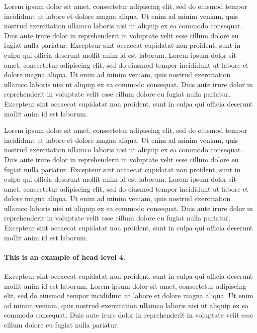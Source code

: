 \documentclass[english]{sbcreviews-2025}%
\begin{document}
Lorem ipsum dolor sit amet, consectetur adipiscing elit, sed do eiusmod tempor incididunt ut labore et dolore magna aliqua. Ut enim ad minim veniam, quis nostrud exercitation ullamco laboris nisi ut aliquip ex ea commodo consequat. Duis aute irure dolor in reprehenderit in voluptate velit esse cillum dolore eu fugiat nulla pariatur. Excepteur sint occaecat cupidatat non proident, sunt in culpa qui officia deserunt mollit anim id est laborum. Lorem ipsum dolor sit amet, consectetur adipiscing elit, sed do eiusmod tempor incididunt ut labore et dolore magna aliqua. Ut enim ad minim veniam, quis nostrud exercitation ullamco laboris nisi ut aliquip ex ea commodo consequat. Duis aute irure dolor in reprehenderit in voluptate velit esse cillum dolore eu fugiat nulla pariatur. Excepteur sint occaecat cupidatat non proident, sunt in culpa qui officia deserunt mollit anim id est laborum.

Lorem ipsum dolor sit amet, consectetur adipiscing elit, sed do eiusmod tempor incididunt ut labore et dolore magna aliqua. Ut enim ad minim veniam, quis nostrud exercitation ullamco laboris nisi ut aliquip ex ea commodo consequat. Duis aute irure dolor in reprehenderit in voluptate velit esse cillum dolore eu fugiat nulla pariatur. Excepteur sint occaecat cupidatat non proident, sunt in culpa qui officia deserunt mollit anim id est laborum. Lorem ipsum dolor sit amet, consectetur adipiscing elit, sed do eiusmod tempor incididunt ut labore et dolore magna aliqua. Ut enim ad minim veniam, quis nostrud exercitation ullamco laboris nisi ut aliquip ex ea commodo consequat. Duis aute irure dolor in reprehenderit in voluptate velit esse cillum dolore eu fugiat nulla pariatur. Excepteur sint occaecat cupidatat non proident, sunt in culpa qui officia deserunt mollit anim id est laborum.



\paragraph{This is an example of head level 4.}

Excepteur sint occaecat cupidatat non proident, sunt in culpa qui officia deserunt mollit anim id est laborum. Lorem ipsum dolor sit amet, consectetur adipiscing elit, sed do eiusmod tempor incididunt ut labore et dolore magna aliqua. Ut enim ad minim veniam, quis nostrud exercitation ullamco laboris nisi ut aliquip ex ea commodo consequat. Duis aute irure dolor in reprehenderit in voluptate velit esse cillum dolore eu fugiat nulla pariatur. 
\end{document}
